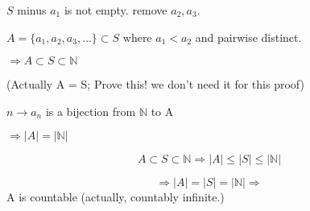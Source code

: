 \documentclass[class=scrartcl, crop=false]{standalone}
\begin{document}
 $S$ minus $a_1$ is not empty. remove $a_2, a_3$.

 $A = \{a_1, a_2, a_3, \dots\} \subset S$ where $a_1 < a_2$ and pairwise distinct.

 $\Rightarrow A \subset S \subset \mathbb{N}$

 (Actually A = S; Prove this! we don't need it for this proof)

 $n \to a_n$ is a bijection from $\mathbb{N}$ to A

 $\Rightarrow |A| = |\mathbb{N}|$

 $$A \subset S \subset \mathbb{N} \Rightarrow |A| \leq |S| \leq |\mathbb{N}|$$

 $$ \Rightarrow |A| = |S| = |\mathbb{N}| \Rightarrow $$ A is countable (actually, countably infinite.)

 
 
\end{document}
